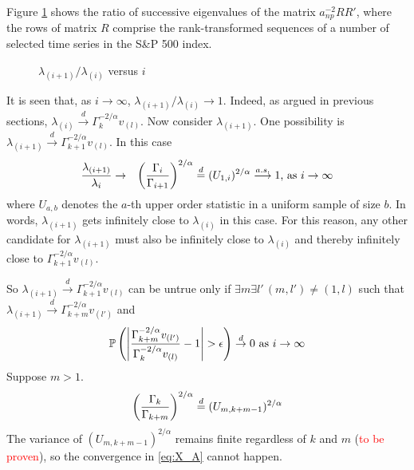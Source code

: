 Figure \ref{fig:EigenRatio} shows the ratio of successive eigenvalues
of the matrix $a_{np}^{-2}RR'$, where the rows of matrix $R$ comprise
the rank-transformed sequences of a number of selected time series
in the S\&P 500 index.
\begin{figure}[htb!]
  \centering
  \caption{$\lambda_{(i+1)} / \lambda_{(i)}$ versus $i$}
  \label{fig:EigenRatio}
\end{figure}
It is seen that, as $i \to \infty$, $\lambda_{(i+1)} / \lambda_{(i)}
\to 1$.
Indeed, as argued in previous sections, $ \lambda_{(i)} \overset{d}{\to}
\Gamma_k^{-2/\alpha} v_{(l)}$.  Now consider $\lambda_{(i+1)}$. One
possibility is $\lambda_{(i+1)} \overset{d}{\to} \Gamma_{k+1}^{-2/\alpha}
v_{(l)}$. In this case
\begin{eqnarray*}
  {\lambda_{(i+1)} \over \lambda_{i}} &\to& \left(
    \Gamma_{i} \over \Gamma_{i+1} \right)^{2/\alpha}
  \overset{d}{=} (U_{1,i})^{2/\alpha} \overset{a.s.}{\longrightarrow}
  1\text{, as }i \to \infty
\end{eqnarray*}
where $U_{a,b}$ denotes the $a$-th upper order statistic in a uniform
sample of size $b$. In words, $\lambda_{(i+1)}$ gets infinitely close to
$\lambda_{(i)}$ in this case. For this reason, any other candidate for
$\lambda_{(i+1)}$ must also be infinitely close to $\lambda_{(i)}$ and
thereby infinitely close to $\Gamma_{k+1}^{-2/\alpha} v_{(l)}$.

So $ \lambda_{(i+1)} \overset{d}{\to} \Gamma_{k+1}^{-2/\alpha}
v_{(l)}$ can be untrue only if $\exists m\exists l'\,(m,l') \neq (1,
l)$ such that $ \lambda_{(i+1)} \overset{d}{\to}
\Gamma_{k+m}^{-2/\alpha} v_{(l')}$ and
\begin{equation}
  \label{eq:X_A}
  \P\left(\left|
    {\Gamma_{k+m}^{-2/\alpha} v_{(l')} \over \Gamma_{k}^{-2/\alpha}
      v_{(l)}} - 1\right| > \epsilon
  \right) \overset{d}{\to} 0 \text{ as } i \to \infty
\end{equation}
Suppose $m > 1$.
\[
\left(
  \Gamma_{k} \over \Gamma_{k+m}
\right)^{2/\alpha} \overset{d}{=} (U_{m,k+m-1})^{2/\alpha}
\]
The variance of $(U_{m,k+m-1})^{2/\alpha}$ remains finite regardless
of $k$ and $m$ (\textcolor{red}{to be proven}), so the convergence in
\eqref{eq:X_A} cannot happen.
